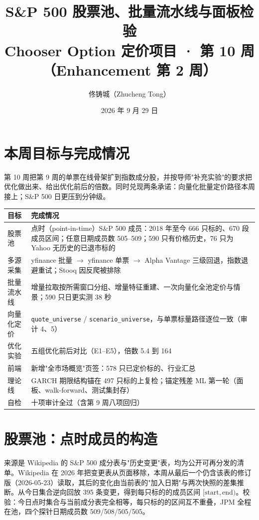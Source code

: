 \documentclass[11pt]{ctexart}
\title{\textbf{S\&P 500 股票池、批量流水线与面板检验}\\
\large Chooser Option 定价项目 · 第 10 周（Enhancement 第 2 周）}
\author{佟铸城（Zhucheng Tong）}
\date{2026 年 9 月 29 日}
\begin{document}
\maketitle

\section{本周目标与完成情况}

第 10 周把第 9 周的单票在线骨架扩到指数成分股，并按导师"补充实验"的要求把优化做出来、给出优化前后的倍数。同时兑现两条承诺：向量化批量定价路径本周接上；S\&P 500 日更压到分钟级。

\begin{center}\small
\begin{tabular}{p{4.0cm}p{11.0cm}}
\toprule
目标 & 完成情况 \\
\midrule
股票池 & 点时（point-in-time）S\&P 500 成员：2018 年至今 666 只标的、670 段成员区间；任意日期成员数 505--509；590 只有价格历史，76 只为 Yahoo 无历史的已退市标的 \\
多源采集 & yfinance 批量 $\to$ yfinance 单票 $\to$ Alpha Vantage 三级回退，指数退避重试；Stooq 因反爬被排除 \\
批量流水线 & 增量拉取按所需窗口分组、增量特征重建、一次向量化全池定价与情景；590 只日更实测 38 秒 \\
向量化定价 & \texttt{quote\_universe} / \texttt{scenario\_universe}，与单票标量路径逐位一致（审计 4、5） \\
优化实验 & 五组优化前后对比（E1--E5），倍数 5.4 到 164 \\
前端 & 新增"全市场概览"页签：578 只已定价标的、行业汇总 \\
理论线 & GARCH 期限结构锚在 497 只标的上复检；锚定残差 ML 第一轮（面板、walk-forward、测试集封存） \\
自检 & 十项审计全过（含第 9 周八项回归） \\
\bottomrule
\end{tabular}
\end{center}

\section{股票池：点时成员的构造}

来源是 Wikipedia 的 S\&P 500 成分表与"历史变更"表，均为公开可再分发的清单。Wikipedia 在 2026 年把变更表从页面移除，本周从最后一个仍含该表的修订版（2026-05-23）读取，其后的变化由当前表的"加入日期"与两次快照的差集推断。从今日集合逆向回放 395 条变更，得到每只标的的成员区间 $[\text{start},\text{end})$。校验：今日点时集合与当前成分表完全相等，每只标的的区间互不重叠，JPM 全程在池，四个探针日期成员数 509/508/505/505。
\end{document}
